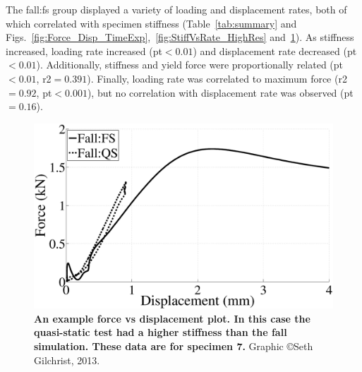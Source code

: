 The fall:\ac{fs} group displayed a variety of loading and displacement rates, both of which correlated with specimen stiffness (Table~\ref{tab:summary} and Figs.~\ref{fig:Force_Disp_TimeExp},~\ref{fig:StiffVsRate_HighRes} and~\ref{fig:Force_DispExp}).
As stiffness increased, loading rate increased (\ac{pt}$ < 0.01$) and displacement rate decreased (\ac{pt}$ < 0.01$).
Additionally, stiffness and yield force were proportionally related (\ac{pt}$ < 0.01$, \ac{r2}$ = 0.391$).
Finally, loading rate was correlated to maximum force (\ac{r2}$ =0.92$, \ac{pt}$ < 0.001$), but no correlation with displacement rate was observed (\ac{pt}$ = 0.16$).

\begin{figure}
\centering
\includegraphics[width=\linewidth]{./behave_fail/Figures/Force_DispExp}
\caption[Force \acs*{vs} displacement example]{\textbf{An example force \ac{vs} displacement plot. In this case the quasi-static test had a higher stiffness than the fall simulation. These data are for specimen 7.} Graphic \copyright Seth Gilchrist, 2013.}
\label{fig:Force_DispExp}
\end{figure}

